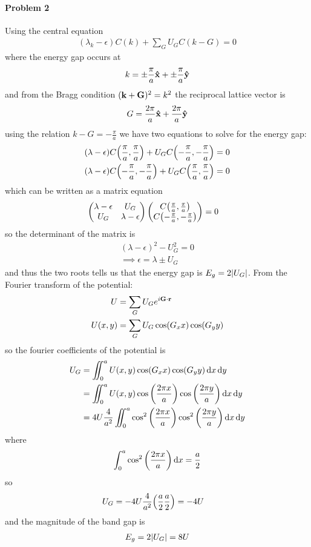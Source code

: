 \documentclass[../main.tex]{subfiles}
\begin{document}
\paragraph*{Problem 2} Using the central equation
\begin{align*}
    (\lambda_k - \epsilon) C(k) + \sum_G U_G C(k - G) = 0
\end{align*}
where the energy gap occurs at
\begin{align*}
    k = \pm \frac{\pi}{a} \vu x + \pm \frac{\pi}{a} \vu y
\end{align*}
and from the Bragg condition $(\vb k + \vb G)^2 = k^2$ the reciprocal lattice vector is
\begin{align*}
    G = \frac{2\pi}{a} \vu x + \frac{2\pi}{a} \vu y
\end{align*}
using the relation $k - G = -\frac{\pi}{a}$ we have two equations to solve for the energy gap:
\begin{align*}
    (\lambda - \epsilon) C\qt(\frac{\pi}{a}, \frac{\pi}{a}) + U_G C\qt(-\frac{\pi}{a}, -\frac{\pi}{a}) = 0 \\
    (\lambda - \epsilon) C\qt(-\frac{\pi}{a}, -\frac{\pi}{a}) + U_G C\qt(\frac{\pi}{a}, \frac{\pi}{a}) = 0
\end{align*}
which can be written as a matrix equation
\begin{align*}
    \begin{pmatrix}
        \lambda - \epsilon & U_G \\
        U_G & \lambda - \epsilon
    \end{pmatrix}
    \begin{pmatrix}
        C\qt(\frac{\pi}{a}, \frac{\pi}{a}) \\
        C\qt(-\frac{\pi}{a}, -\frac{\pi}{a})
    \end{pmatrix}
    &= 0
\end{align*}
so the determinant of the matrix is
\begin{align*}
    (\lambda - \epsilon)^2 - U_G^2 = 0 \\
    \implies \epsilon = \lambda \pm U_G
\end{align*}
and thus the two roots tells us that the energy gap is $E_g = 2\abs{U_G}$. From the Fourier transform of the potential:
\begin{align*}
    U &= \sum_G U_G e^{i\vb G \cdot \vb r} \\
    U(x,y) &= \sum_G U_G \cos(G_x x) \cos(G_y y)
\end{align*}
so the fourier coefficients of the potential is 
\begin{align*}
    U_G &= \iint_0^a U(x,y) \cos(G_x x) \cos(G_y y) \dd{x} \dd{y} \\
    &= \iint_0^a U(x,y) \cos\qt(\frac{2\pi x}{a}) \cos\qt(\frac{2\pi y}{a}) \dd{x} \dd{y} \\
    &= 4U \frac{4}{a^2}\iint_0^a \cos^2\qt(\frac{2\pi x}{a}) \cos^2\qt(\frac{2\pi y}{a}) \dd{x} \dd{y} \\
\end{align*}
where \begin{align*}
    \int_0^a \cos^2\qt(\frac{2\pi x}{a}) \dd{x} = \frac{a}{2}
\end{align*}
so
\begin{align*}
    U_G &= -4U \frac{4}{a^2} \qt(\frac{a}{2}\frac{a}{2}) = -4U
\end{align*}
and the magnitude of the band gap is
\begin{align*}
    E_g = 2\abs{U_G} = 8U
\end{align*}
\end{document}
